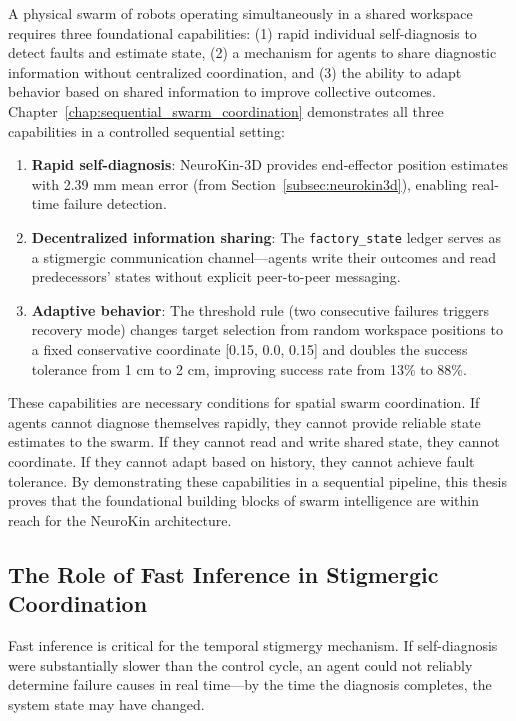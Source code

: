 \documentclass[12pt,a4paper,oneside]{report}
\begin{document}
A physical swarm of robots operating simultaneously in a shared workspace requires three foundational capabilities: (1) rapid individual self-diagnosis to detect faults and estimate state, (2) a mechanism for agents to share diagnostic information without centralized coordination, and (3) the ability to adapt behavior based on shared information to improve collective outcomes. Chapter~\ref{chap:sequential_swarm_coordination} demonstrates all three capabilities in a controlled sequential setting:

\begin{enumerate}
    \item \textbf{Rapid self-diagnosis}: NeuroKin-3D provides end-effector position estimates with 2.39 mm mean error (from Section~\ref{subsec:neurokin3d}), enabling real-time failure detection.
    \item \textbf{Decentralized information sharing}: The \texttt{factory\_state} ledger serves as a stigmergic communication channel—agents write their outcomes and read predecessors' states without explicit peer-to-peer messaging.
    \item \textbf{Adaptive behavior}: The threshold rule (two consecutive failures triggers recovery mode) changes target selection from random workspace positions to a fixed conservative coordinate [0.15, 0.0, 0.15] and doubles the success tolerance from 1 cm to 2 cm, improving success rate from 13\% to 88\%.
\end{enumerate}

These capabilities are necessary conditions for spatial swarm coordination. If agents cannot diagnose themselves rapidly, they cannot provide reliable state estimates to the swarm. If they cannot read and write shared state, they cannot coordinate. If they cannot adapt based on history, they cannot achieve fault tolerance. By demonstrating these capabilities in a sequential pipeline, this thesis proves that the foundational building blocks of swarm intelligence are within reach for the NeuroKin architecture.

\subsection{The Role of Fast Inference in Stigmergic Coordination}
\label{subsec:the_role_of_fast_inference_in_stigmergic_coordination}

Fast inference is critical for the temporal stigmergy mechanism. If self-diagnosis were substantially slower than the control cycle, an agent could not reliably determine failure causes in real time—by the time the diagnosis completes, the system state may have changed.
\end{document}
